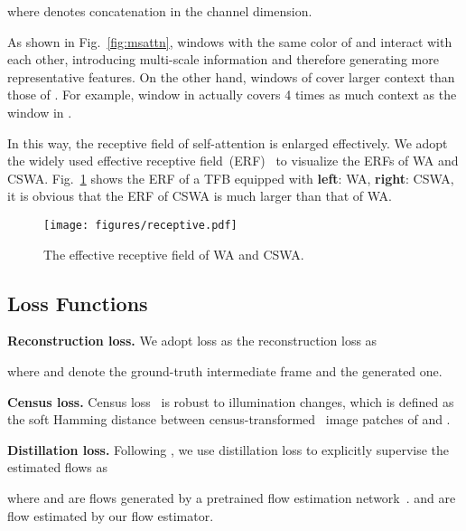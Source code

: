 \documentclass[10pt,twocolumn,letterpaper]{article}
\begin{document}
	where  denotes concatenation in the channel dimension.
	
	
	As shown in Fig.~\ref{fig:msattn}, windows with the same color of  and  interact with each other, introducing multi-scale information and therefore generating more representative features. On the other hand, windows of  cover larger context than those of . For example, window  in  actually covers 4 times as much context as the window  in .
	
	In this way, the receptive field of self-attention is enlarged effectively. We adopt the widely used effective receptive field~(ERF)~\cite{erf} to visualize the ERFs of WA and CSWA. Fig.~\ref{fig:receptive} shows the ERF of a TFB equipped with {\bf left}: WA, {\bf right}: CSWA, it is obvious that the ERF of CSWA is much larger than that of WA.


	\begin{figure}[t]
		\begin{center}
\texttt{[image: figures/receptive.pdf]}
		\end{center}
		\vspace{-0.1in}
		\caption{The effective receptive field of WA and CSWA.}
		\label{fig:receptive}
		\vspace{-0.1in}
	\end{figure}
	
	


\subsection{Loss Functions}
	
	\noindent\textbf{Reconstruction loss.} We adopt  loss as the reconstruction loss as
	
	where  and  denote the ground-truth intermediate frame and the generated one.
	
	\vspace{0.05in}
	\noindent\textbf{Census loss.} Census loss~\cite{meister2018unflow,zhong2019unsupervised}  is robust to illumination changes, which is defined as the soft Hamming distance between census-transformed~\cite{zabih1994non} image patches of  and .

	\vspace{0.05in}	
	\noindent\textbf{Distillation loss.} Following \cite{rife}, we use distillation loss to explicitly supervise the estimated flows as
	
	where  and  are flows generated by a pretrained flow estimation network~\cite{hui2018liteflownet}.  and  are flow estimated by our flow estimator. 
\end{document}
